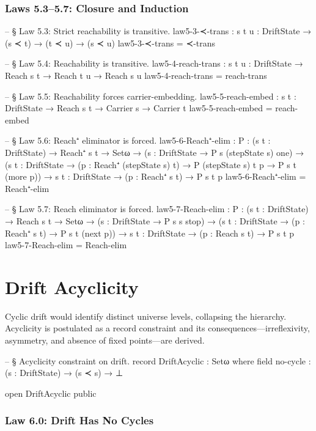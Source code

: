 \documentclass[11pt,a4paper]{book}
\begin{document}
\subsection{Laws 5.3--5.7: Closure and Induction}

\begin{code}
-- § Law 5.3: Strict reachability is transitive.
law5-3-≺-trans : {s t u : DriftState} → (s ≺ t) → (t ≺ u) → (s ≺ u)
law5-3-≺-trans = ≺-trans

-- § Law 5.4: Reachability is transitive.
law5-4-reach-trans : {s t u : DriftState} → Reach s t → Reach t u → Reach s u
law5-4-reach-trans = reach-trans

-- § Law 5.5: Reachability forces carrier-embedding.
law5-5-reach-embed : {s t : DriftState} → Reach s t → Carrier s → Carrier t
law5-5-reach-embed = reach-embed

-- § Law 5.6: Reach⁺ eliminator is forced.
law5-6-Reach⁺-elim :
  {P : (s t : DriftState) → Reach⁺ s t → Setω} →
  ({s : DriftState} → P s (stepState s) one) →
  ({s t : DriftState} → (p : Reach⁺ (stepState s) t) → P (stepState s) t p → P s t (more p)) →
  {s t : DriftState} → (p : Reach⁺ s t) → P s t p
law5-6-Reach⁺-elim = Reach⁺-elim

-- § Law 5.7: Reach eliminator is forced.
law5-7-Reach-elim :
  {P : (s t : DriftState) → Reach s t → Setω} →
  ({s : DriftState} → P s s stop) →
  ({s t : DriftState} → (p : Reach⁺ s t) → P s t (next p)) →
  {s t : DriftState} → (p : Reach s t) → P s t p
law5-7-Reach-elim = Reach-elim
\end{code}

\chapter{Drift Acyclicity}

Cyclic drift would identify distinct universe levels, collapsing the hierarchy. Acyclicity is postulated as a record constraint and its consequences---irreflexivity, asymmetry, and absence of fixed points---are derived.

\begin{code}
-- § Acyclicity constraint on drift.
record DriftAcyclic : Setω where
  field
    no-cycle : (s : DriftState) → (s ≺ s) → ⊥

open DriftAcyclic public
\end{code}

\subsection{Law 6.0: Drift Has No Cycles}
\end{document}
